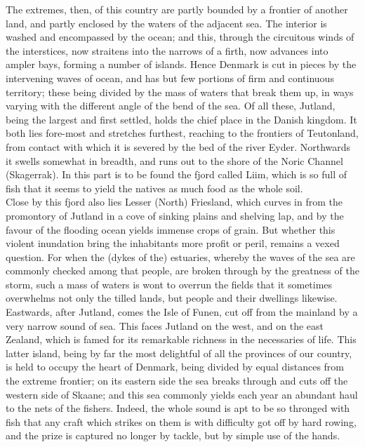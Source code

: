 \documentclass[10pt,a4paper]{report}
\begin{document}
The extremes, then, of this country are partly bounded by a frontier of another land, and partly enclosed by the waters of the adjacent sea. The interior is washed and encompassed by the ocean; and this, through the circuitous winds of the interstices, now straitens into the narrows of a firth, now advances into ampler bays, forming a number of islands. Hence Denmark is cut in pieces by the intervening waves of ocean, and has but few portions of firm and continuous territory; these being divided by the mass of waters that break them up, in ways varying with the different angle of the bend of the sea. Of all these, Jutland, being the largest and first settled, holds the chief place in the Danish kingdom. It both lies fore-most and stretches furthest, reaching to the frontiers of Teutonland, from contact with which it is severed by the bed of the river Eyder. Northwards it swells somewhat in breadth, and runs out to the shore of the Noric Channel (Skagerrak). In this part is to be found the fjord called Liim, which is so full of fish that it seems to yield the natives as much food as the whole soil.\\

Close by this fjord also lies Lesser (North) Friesland, which curves in from the promontory of Jutland in a cove of sinking plains and shelving lap, and by the favour of the flooding ocean yields immense crops of grain. But whether this violent inundation bring the inhabitants more profit or peril, remains a vexed question. For when the (dykes of the) estuaries, whereby the waves of the sea are commonly checked among that people, are broken through by the greatness of the storm, such a mass of waters is wont to overrun the fields that it sometimes overwhelms not only the tilled lands, but people and their dwellings likewise.\\

Eastwards, after Jutland, comes the Isle of Funen, cut off from the mainland by a very narrow sound of sea. This faces Jutland on the west, and on the east Zealand, which is famed for its remarkable richness in the necessaries of life. This latter island, being by far the most delightful of all the provinces of our country, is held to occupy the heart of Denmark, being divided by equal distances from the extreme frontier; on its eastern side the sea breaks through and cuts off the western side of Skaane; and this sea commonly yields each year an abundant haul to the nets of the fishers. Indeed, the whole sound is apt to be so thronged with fish that any craft which strikes on them is with difficulty got off by hard rowing, and the prize is captured no longer by tackle, but by simple use of the hands.\\
\end{document}
